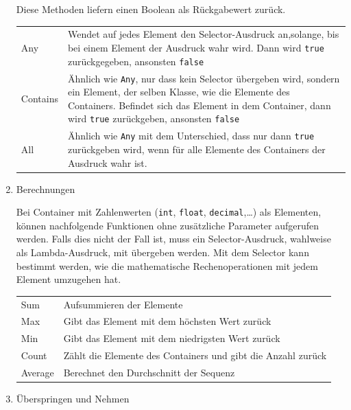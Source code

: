 \documentclass[a4paper,12pt,oneside]{book}
\begin{document}
\begin{enumerate}
\label{sec-4-3-1-3}
Diese Methoden liefern einen Boolean als Rückgabewert zurück.
\begin{center}
	\bgroup
	\def\arraystretch{1.5}%
	\begin{tabularx}{\textwidth}{|p{5cm}|X|}
Any & Wendet auf jedes Element den Selector-Ausdruck an,solange, bis bei einem Element der Ausdruck wahr wird. Dann wird \texttt{true} zurückgegeben, ansonsten \texttt{false}\\
Contains & Ähnlich wie \texttt{Any}, nur dass kein Selector übergeben wird, sondern ein Element, der selben Klasse, wie die Elemente des Containers. Befindet sich das Element in dem Container, dann wird \texttt{true} zurückgeben, ansonsten \texttt{false}\\
All & Ähnlich wie \texttt{Any} mit dem Unterschied, dass nur dann \texttt{true} zurückgeben wird, wenn für alle Elemente des Containers der Ausdruck wahr ist.\\
\end{tabularx}
\egroup
\end{center}
\item Berechnungen

\label{sec-4-3-1-4}
Bei Container mit Zahlenwerten (\texttt{int}, \texttt{float}, \texttt{decimal},\ldots{}) als Elementen,
können nachfolgende Funktionen ohne zusätzliche Parameter aufgerufen werden.
Falls dies nicht der Fall ist, muss ein Selector-Ausdruck, wahlweise als
Lambda-Ausdruck, mit übergeben werden. Mit dem Selector kann bestimmt werden, wie
die mathematische Rechenoperationen mit jedem Element umzugehen hat.
\begin{center}
	\bgroup
	\def\arraystretch{1.5}%
	\begin{tabularx}{\textwidth}{|p{5cm}|X|}
Sum & Aufsummieren der Elemente\\
Max & Gibt das Element mit dem höchsten Wert zurück\\
Min & Gibt das Element mit dem niedrigsten Wert zurück\\
Count & Zählt die Elemente des Containers und gibt die Anzahl zurück\\
Average & Berechnet den Durchschnitt der Sequenz\\
\end{tabularx}
\egroup
\end{center}
\item Überspringen und Nehmen


\end{enumerate}
\end{document}
